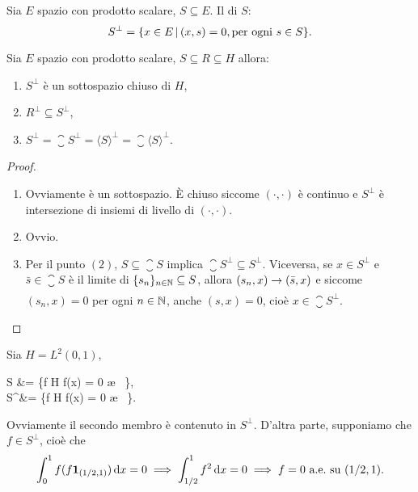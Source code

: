\begin{definition}
	Sia $E$ spazio con prodotto scalare, $S \subseteq E$. Il  di $S$:
	\begin{equation*}
		S^\perp = \{ x \in E \,|\, (x,s) = 0, \text{per ogni $s \in S$} \}.
	\end{equation*}
\end{definition}

\begin{lemma}
\label{lemma:hilb_ort_comp}
	Sia $E$ spazio con prodotto scalare, $S \subseteq R \subseteq H$ allora:
	\begin{enumerate}
		\item $S^\perp$ è un sottospazio chiuso di $H$,
		\item $R^\perp \subseteq S^\perp$,
		\item $S^\perp = \closure{S}^\perp = \langle S \rangle ^\perp = \closure{\langle S \rangle}^\perp$.
	\end{enumerate}
\end{lemma}
\begin{proof}
	\leavevmode
	\begin{enumerate}
		\item Ovviamente è un sottospazio. È chiuso siccome $(\cdot, \cdot)$ è continuo e $S^\perp$ è intersezione di insiemi di livello di $(\cdot, \cdot)$.
		\item Ovvio.
		\item Per il punto $(2)$, $S \subseteq \closure S$ implica $\closure{S}^\perp \subseteq S^\perp$. Viceversa, se $x \in S^\perp$ e $\bar s \in \closure S$ è il limite di $\{s_n\}_{n \in \mathbb{N}} \subseteq S$, allora $(s_n, x) \underset{{}}{\rightarrow} (\bar s,x)$ e siccome $(s_n,x) = 0$ per ogni $n \in \mathbb{N}$, anche $(s,x) = 0$, cioè $x \in \closure S^\perp$.
	\end{enumerate}
\end{proof}

\begin{example}
	Sia $H = L^2(0,1)$,
	\begin{eqalign*}
		S &= \{f \in H \suchthat f(x) = 0 \ae\  \},\\
		S^\perp &= \{f \in H \suchthat f(x) = 0 \ae\  \}.
	\end{eqalign*}
	Ovviamente il secondo membro è contenuto in $S^\perp$. D'altra parte, supponiamo che $f \in S^\perp$, cioè che
	\begin{equation*}
		\int_0^1 f (f {\boldsymbol{1}}_{(1/2,1)})\,\mathrm{d} x = 0 \implies \int_{1/2}^1 f^2\,\mathrm{d} x = 0 \implies f = 0 \ \text{a.e.}\ \text{su $(1/2,1)$}.
	\end{equation*}
\end{example}

